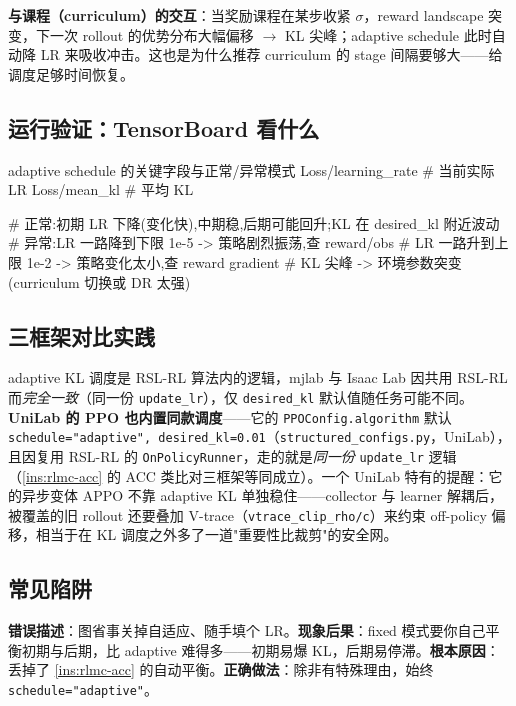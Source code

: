 \textbf{与课程（curriculum）的交互}：当奖励课程在某步收紧 $\sigma$，reward landscape 突变，下一次 rollout 的优势分布大幅偏移 $\to$ KL 尖峰；adaptive schedule 此时自动降 LR 来吸收冲击。这也是为什么推荐 curriculum 的 stage 间隔要够大——给调度足够时间恢复。

\subsection{运行验证：TensorBoard 看什么}

\begin{codebox}{adaptive schedule 的关键字段与正常/异常模式}
Loss/learning_rate   # 当前实际 LR
Loss/mean_kl         # 平均 KL

# 正常:初期 LR 下降(变化快),中期稳,后期可能回升;KL 在 desired_kl 附近波动
# 异常:LR 一路降到下限 1e-5  -> 策略剧烈振荡,查 reward/obs
#      LR 一路升到上限 1e-2  -> 策略变化太小,查 reward gradient
#      KL 尖峰              -> 环境参数突变(curriculum 切换或 DR 太强)
\end{codebox}

\subsection{三框架对比实践}

adaptive KL 调度是 RSL-RL 算法内的逻辑，mjlab 与 Isaac Lab 因共用 RSL-RL 而\emph{完全一致}（同一份 \verb|update_lr|），仅 \verb|desired_kl| 默认值随任务可能不同。\textbf{UniLab 的 PPO 也内置同款调度}——它的 \verb|PPOConfig.algorithm| 默认 \verb|schedule="adaptive", desired_kl=0.01|（\verb|structured_configs.py|，UniLab），且因复用 RSL-RL 的 \verb|OnPolicyRunner|，走的就是\emph{同一份} \verb|update_lr| 逻辑（\cref{ins:rlmc-acc} 的 ACC 类比对三框架等同成立）。一个 UniLab 特有的提醒：它的异步变体 APPO 不靠 adaptive KL 单独稳住——collector 与 learner 解耦后，被覆盖的旧 rollout 还要叠加 V-trace（\verb|vtrace_clip_rho/c|）来约束 off-policy 偏移，相当于在 KL 调度之外多了一道"重要性比裁剪"的安全网。

\subsection{常见陷阱}

\begin{pitfall}[手动设 \texttt{schedule="fixed"} 却没仔细选 LR]
\textbf{错误描述}：图省事关掉自适应、随手填个 LR。\textbf{现象后果}：fixed 模式要你自己平衡初期与后期，比 adaptive 难得多——初期易爆 KL，后期易停滞。\textbf{根本原因}：丢掉了 \cref{ins:rlmc-acc} 的自动平衡。\textbf{正确做法}：除非有特殊理由，始终 \verb|schedule="adaptive"|。
\end{pitfall}

